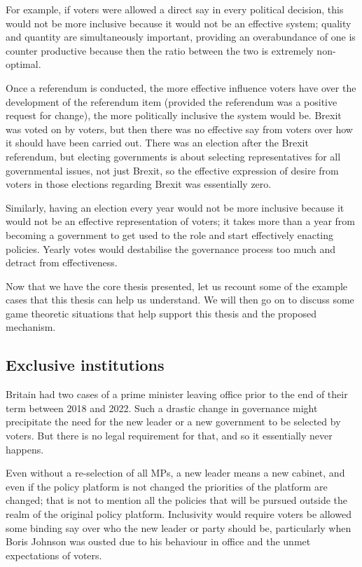\documentclass[twoside]{article}
\begin{document}
For example, if voters were allowed a direct say in every political decision, this would not be more inclusive because it would not be an effective system; quality and quantity are simultaneously important, providing an overabundance of one is counter productive because then the ratio between the two is extremely non-optimal.

Once a referendum is conducted, the more effective influence voters have over the development of the referendum item (provided the referendum was a positive request for change), the more politically inclusive the system would be. Brexit was voted on by voters, but then there was no effective say from voters over how it should have been carried out. There was an election after the Brexit referendum, but electing governments is about selecting representatives for all governmental issues, not just Brexit, so the effective expression of desire from voters in those elections regarding Brexit was essentially zero.

Similarly, having an election every year would not be more inclusive because it would not be an effective representation of voters; it takes more than a year from becoming a government to get used to the role and start effectively enacting policies. Yearly votes would destabilise the governance process too much and detract from effectiveness.

Now that we have the core thesis presented, let us recount some of the example cases that this thesis can help us understand. We will then go on to discuss some game theoretic situations that help support this thesis and the proposed mechanism.

\subsection{Exclusive institutions}

Britain had two cases of a prime minister leaving office prior to the end of their term between 2018 and 2022. Such a drastic change in governance might precipitate the need for the new leader or a new government to be selected by voters. But there is no legal requirement for that, and so it essentially never happens.

Even without a re-selection of all MPs, a new leader means a new cabinet, and even if the policy platform is not changed the priorities of the platform are changed; that is not to mention all the policies that will be pursued outside the realm of the original policy platform. Inclusivity would require voters be allowed some binding say over who the new leader or party should be, particularly when Boris Johnson was ousted due to his behaviour in office and the unmet expectations of voters.
\end{document}
